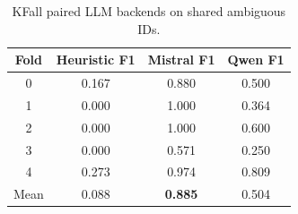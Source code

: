 \begin{table}[!t]
\centering
\caption{KFall paired LLM backends on shared ambiguous IDs.}
\label{tab:kfallllm}
\begin{tabular}{cccc}
\toprule
Fold & Heuristic F1 & Mistral F1 & Qwen F1 \\
\midrule
0 & 0.167 & 0.880 & 0.500 \\
1 & 0.000 & 1.000 & 0.364 \\
2 & 0.000 & 1.000 & 0.600 \\
3 & 0.000 & 0.571 & 0.250 \\
4 & 0.273 & 0.974 & 0.809 \\
\midrule
Mean & 0.088 & \textbf{0.885} & 0.504 \\
\bottomrule
\end{tabular}
\end{table}
